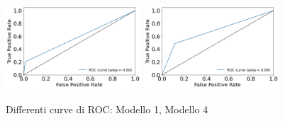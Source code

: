\begin{figure}[H]
    \centering
    \includegraphics[width=0.45\textwidth]{Immagini/ROCM1.png}
    \includegraphics[width=0.45\textwidth]{Immagini/ROCM4.png}
    \caption{Differenti curve di ROC: Modello 1, Modello 4}
    \label{fig:ROC}
\end{figure}
   

